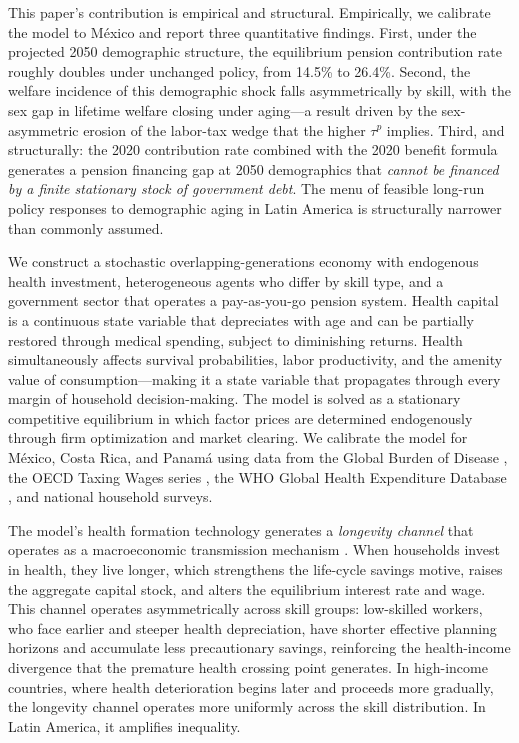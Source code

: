 \documentclass[12pt,a4paper]{article}
\begin{document}
This paper's contribution is empirical and structural. Empirically, we calibrate the model to M\'exico and report three quantitative findings. First, under the projected 2050 demographic structure, the equilibrium pension contribution rate roughly doubles under unchanged policy, from 14.5\% to 26.4\%. Second, the welfare incidence of this demographic shock falls asymmetrically by skill, with the sex gap in lifetime welfare closing under aging---a result driven by the sex-asymmetric erosion of the labor-tax wedge that the higher $\tau^p$ implies. Third, and structurally: the 2020 contribution rate combined with the 2020 benefit formula generates a pension financing gap at 2050 demographics that \textit{cannot be financed by a finite stationary stock of government debt}. The menu of feasible long-run policy responses to demographic aging in Latin America is structurally narrower than commonly assumed.

We construct a stochastic overlapping-generations economy with endogenous health investment, heterogeneous agents who differ by skill type, and a government sector that operates a pay-as-you-go pension system. Health capital is a continuous state variable that depreciates with age and can be partially restored through medical spending, subject to diminishing returns. Health simultaneously affects survival probabilities, labor productivity, and the amenity value of consumption---making it a state variable that propagates through every margin of household decision-making. The model is solved as a stationary competitive equilibrium in which factor prices are determined endogenously through firm optimization and market clearing. We calibrate the model for M\'exico, Costa Rica, and Panam\'a using data from the Global Burden of Disease \citep{GBD2021}, the OECD Taxing Wages series \citep{OECDTaxingWages2026}, the WHO Global Health Expenditure Database \citep{WHOGHED2024}, and national household surveys.

The model's health formation technology generates a \textit{longevity channel} that operates as a macroeconomic transmission mechanism \citep{Carrasco2026}. When households invest in health, they live longer, which strengthens the life-cycle savings motive, raises the aggregate capital stock, and alters the equilibrium interest rate and wage. This channel operates asymmetrically across skill groups: low-skilled workers, who face earlier and steeper health depreciation, have shorter effective planning horizons and accumulate less precautionary savings, reinforcing the health-income divergence that the premature health crossing point generates. In high-income countries, where health deterioration begins later and proceeds more gradually, the longevity channel operates more uniformly across the skill distribution. In Latin America, it amplifies inequality.
\end{document}
